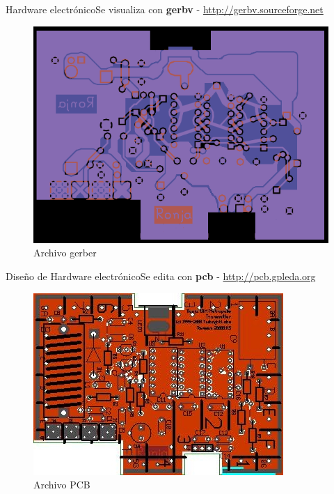 \documentclass{beamer}
\begin{document}
\begin{frame}{Hardware electrónico}{Se visualiza con \textbf{gerbv} - \url{http://gerbv.sourceforge.net}}
  \begin{figure}
    \includegraphics[scale=0.4]{transmisor/transmisor_gerber.png}
    \caption{Archivo gerber}
  \end{figure}
\end{frame}

\begin{frame}{Diseño de Hardware electrónico}{Se edita con \textbf{pcb} - \url{http://pcb.gpleda.org}}
  \begin{figure}
    \includegraphics[scale=0.65]{transmisor/metropolis_transmitter}
    \caption{Archivo PCB}
  \end{figure}
\end{frame}
\end{document}
